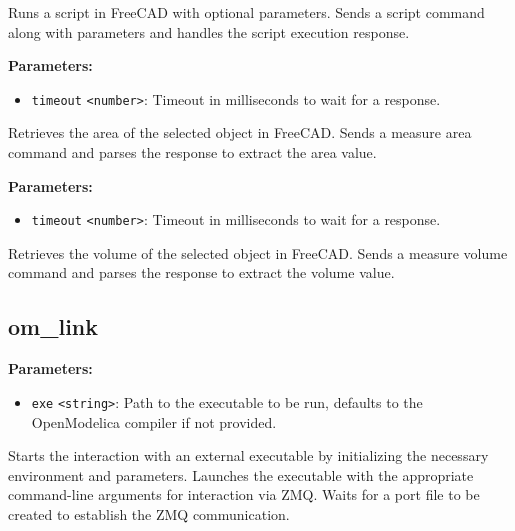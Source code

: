 \documentclass[12pt,a4paper]{article}
\begin{document}
\noindent Runs a script in FreeCAD with optional parameters.
Sends a script command along with parameters and handles the script execution response.

\vspace{5mm}
\noindent {}


\noindent \textbf{Parameters:}
\begin{itemize}
  \item \texttt{timeout} \texttt{<number>}: Timeout in milliseconds to wait for a response.
\end{itemize}

\noindent Retrieves the area of the selected object in FreeCAD.
Sends a measure area command and parses the response to extract the area value.

\vspace{5mm}
\noindent {}


\noindent \textbf{Parameters:}
\begin{itemize}
  \item \texttt{timeout} \texttt{<number>}: Timeout in milliseconds to wait for a response.
\end{itemize}

\noindent Retrieves the volume of the selected object in FreeCAD.
Sends a measure volume command and parses the response to extract the volume value.


\subsection{om\_link}
\vspace{5mm}
\noindent {}


\noindent \textbf{Parameters:}
\begin{itemize}
  \item \texttt{exe} \texttt{<string>}: Path to the executable to be run, defaults to the OpenModelica compiler if not provided.
\end{itemize}

\noindent Starts the interaction with an external executable by initializing the necessary environment and parameters.
Launches the executable with the appropriate command-line arguments for interaction via ZMQ.
Waits for a port file to be created to establish the ZMQ communication.
\end{document}
